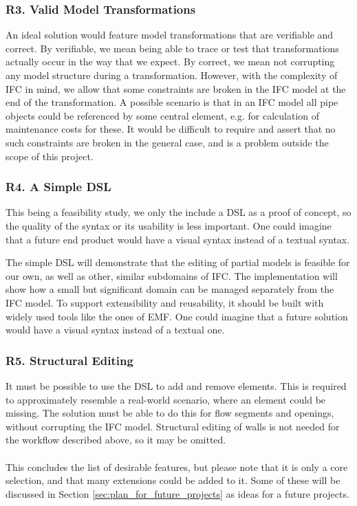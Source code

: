 \subsubsection{R3. Valid Model Transformations}
An ideal solution would feature model transformations that are verifiable and correct. By verifiable, we mean being able to trace or test that transformations actually occur in the way that we expect. By correct, we mean not corrupting any model structure during a transformation. However, with the complexity of IFC in mind, we allow that some constraints are broken in the IFC model at the end of the transformation. A possible scenario is that in an IFC model all pipe objects could be referenced by some central element, e.g. for calculation of maintenance costs for these. It would be difficult to require and assert that no such constraints are broken in the general case, and is a problem outside the scope of this project.

\subsubsection{R4. A Simple DSL}
This being a feasibility study, we only the include a DSL as a proof of concept, so the quality of the syntax or its usability is less important. One could imagine that a future end product would have a visual syntax instead of a textual syntax.

The simple DSL will demonstrate that the editing of partial models is feasible for our own, as well as other, similar subdomains of IFC. The implementation will show how a small but significant domain can be managed separately from the IFC model. To support extensibility and reusability, it should be built with widely used tools like the ones of EMF.  One could imagine that a future solution would have a visual syntax instead of a textual one.

\subsubsection{R5. Structural Editing}
It must be possible to use the DSL to add and remove elements. This is required to approximately resemble a real-world scenario, where an element could be missing. The solution must be able to do this for flow segments and openings, without corrupting the IFC model. Structural editing of walls is not needed for the workflow described above, so it may be omitted.

\paragraph{}
This concludes the list of desirable features, but please note that it is only a core selection, and that many extensions could be added to it. Some of these will be discussed in Section \ref{sec:plan_for_future_projects} as ideas for a future projects.

